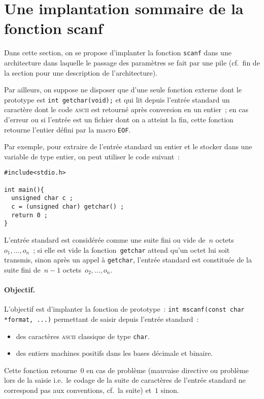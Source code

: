\section{Une implantation sommaire de la fonction scanf}
\label{sec:printf}
Dans cette section, on se propose d'implanter la fonction \verb+scanf+
dans une architecture dans laquelle le passage des param\`etres se
fait par une pile (cf.\ fin de la section pour une description de
l'architecture).

Par ailleurs, on suppose ne disposer que d'une seule fonction externe
dont le prototype est \verb?int getchar(void);? et qui lit depuis
l'entr\'ee standard un caract\`ere dont le code \textsc{ascii} est retourn\'e
apr\`es conversion en un entier~; en cas d'erreur ou si l'entr\'ee est
un fichier dont on a atteint la fin, cette fonction retourne l'entier
d\'efini par la macro \verb+EOF+.

Par exemple, pour extraire de l'entr\'ee standard un entier et le stocker dans une
variable de type entier,  on peut utiliser le code suivant~:
\begin{verbatim}
#include<stdio.h>

int main(){
  unsigned char c ;
  c = (unsigned char) getchar() ;
  return 0 ;
}
\end{verbatim}
L'entr\'ee standard est consid\'er\'ee comme une suite fini ou vide
de~$n$ octets~$o_{1},\ldots,o_{n}$~; si elle est vide la fonction~\verb+getchar+ attend qu'un octet lui soit transmis, sinon apr\`es  un appel \`a \verb+getchar+, l'entr\'ee standard est constitu\'ee de la  suite fini de~${n-1}$ octets~$o_{2},\ldots,o_{n}$.
\par
\paragraph{Objectif.} L'objectif est d'implanter la fonction de
prototype~: \verb?int mscanf(const char *format, ...)?  permettant de
saisir depuis l'entr\'ee standard~:
\begin{itemize}
\item des caract\`eres \textsc{ascii} classique de type \verb+char+.
\item des entiers machines positifs dans les bases d\'ecimale et binaire.
\end{itemize}
Cette fonction retourne~$0$ en cas de probl\`eme (mauvaise directive
ou probl\`eme lors de la saisie i.e.\ le codage de la suite de
caract\`eres de l'entr\'ee standard ne correspond pas aux conventions,
cf.\ la suite) et~$1$ sinon.
